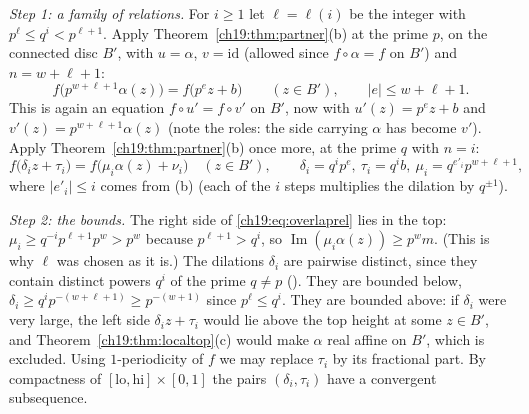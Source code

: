 \emph{Step 1: a family of relations.}  For $i\ge1$ let $\ell=\ell(i)$ be the integer with $p^\ell\le q^i<p^{\ell+1}$.  Apply
Theorem~\ref{ch19:thm:partner}(b) at the prime $p$, on the connected disc $B'$, with $u=\alpha$, $v=\mathrm{id}$ (allowed since
$f\circ\alpha=f$ on $B'$) and $n=w+\ell+1$:
\begin{equation*}
  f\bigl(p^{w+\ell+1}\alpha(z)\bigr)=f\bigl(p^{e}z+b\bigr)\qquad(z\in B'),\qquad|e|\le w+\ell+1 .
\end{equation*}
This is again an equation $f\circ u'=f\circ v'$ on $B'$, now with $u'(z)=p^ez+b$ and $v'(z)=p^{w+\ell+1}\alpha(z)$ (note the roles: the
side carrying $\alpha$ has become $v'$).  Apply Theorem~\ref{ch19:thm:partner}(b) once more, at the prime $q$ with $n=i$:
\begin{equation}\label{ch19:eq:overlaprel}
  f\bigl(\delta_iz+\tau_i\bigr)=f\bigl(\mu_i\alpha(z)+\nu_i\bigr)\quad(z\in B'),\qquad \delta_i=q^ip^{e},\ \tau_i=q^ib,\
  \mu_i=q^{e'_i}p^{w+\ell+1},
\end{equation}
where $|e'_i|\le i$ comes from (b) (each of the $i$ steps multiplies the dilation by $q^{\pm1}$).

\emph{Step 2: the bounds.}  The right side of \eqref{ch19:eq:overlaprel} lies in the top: $\mu_i\ge q^{-i}p^{\ell+1}p^w>p^w$ because
$p^{\ell+1}>q^i$, so $\operatorname{Im}(\mu_i\alpha(z))\ge p^wm$.  (This is why $\ell$ was chosen as it is.)  The dilations $\delta_i$ are
pairwise distinct, since they contain distinct powers $q^i$ of the prime $q\ne p$ (\lean{zpow_ne_pow_of_prime_ne}).  They are bounded below,
$\delta_i\ge q^ip^{-(w+\ell+1)}\ge p^{-(w+1)}$ since $p^\ell\le q^i$.  They are bounded above: if $\delta_i$ were very large, the left side
$\delta_iz+\tau_i$ would lie above the top height at some $z\in B'$, and Theorem~\ref{ch19:thm:localtop}(c) would make $\alpha$ real affine on
$B'$, which is excluded.  Using $1$-periodicity of $f$ we may replace $\tau_i$ by its fractional part.  By compactness of
$[\mathrm{lo},\mathrm{hi}]\times[0,1]$ the pairs $(\delta_i,\tau_i)$ have a convergent subsequence.


